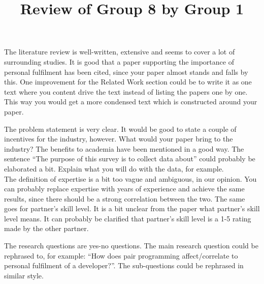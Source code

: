 \documentclass[times, 10pt,twocolumn]{IEEEtran}
\begin{document}
\title{Review of Group 8 by Group 1}

\author{


}


\maketitle
\thispagestyle{empty}







The literature review is well-written, extensive and seems to cover a lot of surrounding studies. It is good that a paper supporting the importance of personal fulfilment has been cited, since your paper almost stands and falls by this. One improvement for the Related Work section could be to write it as one text where you content drive the text instead of listing the papers one by one. This way you would get a more condensed text which is constructed around your paper. 

The problem statement is very clear. It would be good to state a couple of incentives for the industry, however. What would your paper bring to the industry? The benefits to academia have been mentioned in a good way. The sentence ``The purpose of this survey is to collect data about'' could probably be elaborated a bit. Explain what you will do with the data, for example. 
\\

The definition of expertise is a bit too vague and ambiguous, in our opinion. You can probably replace expertise with years of experience and achieve the same results, since there should be a strong correlation between the two. The same goes for partner's skill level. It is a bit unclear from the paper what partner's skill level means. It can probably be clarified that partner's skill level is a 1-5 rating made by the other partner. 


The research questions are yes-no questions. The main research question could be rephrased to, for example: ``How does pair programming affect/correlate to personal fulfilment of a developer?''. The sub-questions could be rephrased in similar style. 
\\
\end{document}
